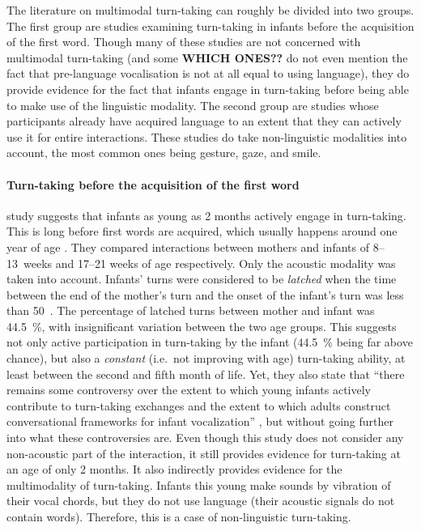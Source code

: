 The literature on multimodal turn-taking can roughly be divided into two groups.
The first group are studies examining turn-taking in infants before the acquisition of the first word.
Though many of these studies are not concerned with multimodal turn-taking (and some \textbf{WHICH ONES??} do not even mention the fact that pre-language vocalisation is not at all equal to using language), they do provide evidence for the fact that infants engage in turn-taking before being able to make use of the linguistic modality.
The second group are studies whose participants already have acquired language to an extent that they can actively use it for entire interactions.
These studies do take non-linguistic modalities into account, the most common ones being gesture, gaze, and smile. %

\paragraph{Turn-taking before the acquisition of the first word}
 study suggests that infants as young as 2 months actively engage in turn-taking.
This is long before first words are acquired, which usually happens around one year of age \citep[, ]{lenneberg_biological_1967,szagun_sprachentwicklung_2013}.
 They compared interactions between mothers and infants of 8--13~weeks and 17--21 weeks of age respectively.
Only the acoustic modality was taken into account.
Infants' turns were considered to be \emph{latched} when the time between the end of the mother's turn and the onset of the infant's turn was less than 50~\ms.
The percentage of latched turns between mother and infant was 44.5~\%, with insignificant variation between the two age groups.
This suggests not only active participation in turn-taking by the infant (44.5~\% being far above chance), but also a \emph{constant} (i.e.\ not improving with age) turn-taking ability, at least between the second and fifth month of life.
Yet, they also state that ``there remains some controversy over the extent to which young infants actively contribute to turn-taking exchanges and the extent to which adults construct conversational frameworks for infant vocalization'' \citep[]{gratier_early_2015}, but without going further into what these controversies are.
Even though this study does not consider any non-acoustic part of the interaction, it still provides evidence for turn-taking at an age of only 2 months.
It also indirectly provides evidence for the multimodality of turn-taking.
Infants this young make sounds by vibration of their vocal chords, but they do not use language (their acoustic signals do not contain words).
Therefore, this is a case of non-linguistic turn-taking.

